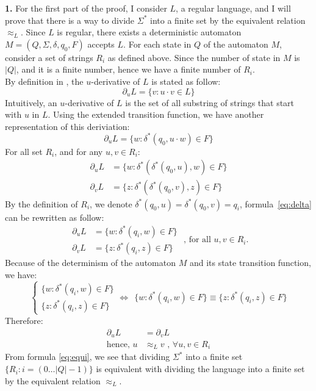 \documentclass[a4paper,12pt]{article}
\begin{document}
\textbf{1.} For the first part of the proof, I consider $L$, a regular language, and I will prove that there is a way to divide $\Sigma^{*}$ into a finite set by the equivalent relation $\approx_{L}$. Since $L$ is regular, there exists a deterministic automaton $M=(Q,\Sigma,\delta,q_{0},F)$ accepts $L$. For each state in $Q$ of the automaton $M$, consider a set of strings $R_{i}$ as defined above. Since the number of state in $M$ is $|Q|$, and it is a finite number, hence we have a finite number of $R_{i}$.\\[1em]
By definition in \cite{lec2}, the $u$-derivative of $L$ is stated as follow:
$$\partial_{u}L = \{v : u\cdot v \in L\}$$
\noindent
Intuitively, an $u$-derivative of $L$ is the set of all substring of strings that start with $u$ in $L$. Using the extended transition function, we have another representation of this deriviation:
$$\partial_{u}L = \{w : \delta^{*}(q_{0},u\cdot w) \in F\}$$
\noindent
For all set $R_{i}$, and for any $u, v \in R_{i}$:
\begin{equation} \label{eq:delta}
    \begin{aligned}
        \partial_{u}L & = \{w : \delta^{*}(\delta^{*}(q_{0},u), w) \in F\} \\
        \partial_{v}L & = \{z : \delta^{*}(\delta^{*}(q_{0},v), z) \in F\}
    \end{aligned}
\end{equation}
\noindent
By the definition of $R_{i}$, we denote $\delta^{*}(q_{0},u) = \delta^{*}(q_{0},v) = q_{i}$, formula~\eqref{eq:delta} can be rewritten as follow:
\begin{equation*}
    \begin{aligned}
        \partial_{u}L & = \{w : \delta^{*}(q_{i}, w) \in F\} \\
        \partial_{v}L & = \{z : \delta^{*}(q_{i}, z) \in F\}
    \end{aligned}
    \mbox{   , for all } u, v \in R_{i}.
\end{equation*}
\noindent
Because of the determinism of the automaton $M$ and its state transition function, we have:
\begin{equation*}
        \begin{cases}
            \{w : \delta^{*}(q_{i}, w) \in F\} \\
            \{z : \delta^{*}(q_{i}, z) \in F\}
        \end{cases}
        \Leftrightarrow\ \  \{w : \delta^{*}(q_{i}, w) \in F\} \equiv \{z : \delta^{*}(q_{i}, z) \in F\}
\end{equation*}
Therefore:
\begin{equation} \label{eq:equi}
    \begin{aligned}
        \partial_{u}L & = \partial_{v}L \\
        \mbox{hence,\ \ \ \ \ } u & \approx_{L} v\mbox{\ \ , } \forall u, v \in R_{i}
    \end{aligned}
\end{equation}
\noindent
From formula \eqref{eq:equi}, we see that dividing $\Sigma^{*}$ into a finite set $\{R_{i} : i = (0\ldots|Q|-1)\}$ is equivalent with dividing the language into a finite set by the equivalent relation $\approx_{L}$.
\end{document}
